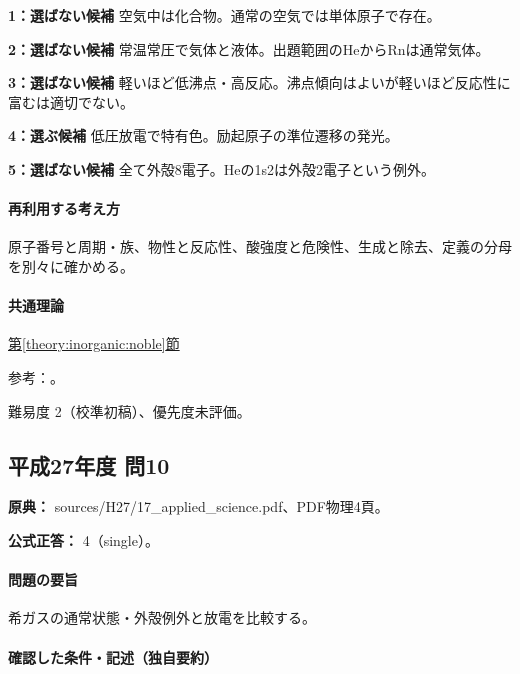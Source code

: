 \noindent\textbf{1：選ばない候補} 空気中は化合物。通常の空気では単体原子で存在。\par

\noindent\textbf{2：選ばない候補} 常温常圧で気体と液体。出題範囲のHeからRnは通常気体。\par

\noindent\textbf{3：選ばない候補} 軽いほど低沸点・高反応。沸点傾向はよいが軽いほど反応性に富むは適切でない。\par

\noindent\textbf{4：選ぶ候補} 低圧放電で特有色。励起原子の準位遷移の発光。\par

\noindent\textbf{5：選ばない候補} 全て外殻8電子。Heの1s2は外殻2電子という例外。\par

\paragraph{再利用する考え方} 原子番号と周期・族、物性と反応性、酸強度と危険性、生成と除去、定義の分母を別々に確かめる。

\paragraph{共通理論} \hyperref[theory:inorganic:noble]{第\ref*{theory:inorganic:noble}節}

\par 参考：\cite{inorganic_noble_ref}。

\par 難易度 2（校準初稿）、優先度未評価。

\subsection{平成27年度 問10}
\label{q:h27-reg-applied-10}

\noindent\textbf{原典：} sources/H27/17\_applied\_science.pdf、PDF物理4頁。

\textbf{公式正答：} 4（single）。

\paragraph{問題の要旨} 希ガスの通常状態・外殻例外と放電を比較する。

\paragraph{確認した条件・記述（独自要約）}\mbox{}\par

